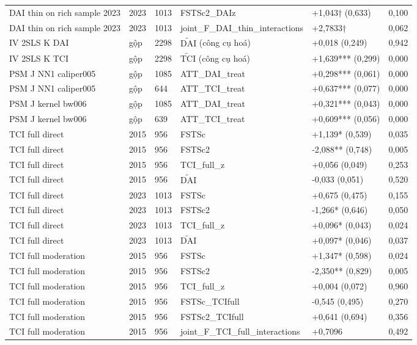 \documentclass[12pt,a4paper]{article}
\begin{document}
\begin{longtable}[]{@{}llllll@{}}
DAI thin on rich sample 2023 & 2023 & 1013 & FSTSc2\_DAIz & +1,043†
(0,633) & 0,100 \\
DAI thin on rich sample 2023 & 2023 & 1013 &
joint\_F\_DAI\_thin\_interactions & +2,7833† & 0,062 \\
IV 2SLS K DAI & gộp & 2298 & \(\tilde{\mathrm{DAI}}\) (công cụ hoá) &
+0,018 (0,249) & 0,942 \\
IV 2SLS K TCI & gộp & 2298 & \(\tilde{\mathrm{TCI}}\) (công cụ hoá) &
+1,639*** (0,299) & 0,000 \\
PSM J NN1 caliper005 & gộp & 1085 & ATT\_DAI\_treat & +0,298*** (0,061)
& 0,000 \\
PSM J NN1 caliper005 & gộp & 644 & ATT\_TCI\_treat & +0,637*** (0,077) &
0,000 \\
PSM J kernel bw006 & gộp & 1085 & ATT\_DAI\_treat & +0,321*** (0,043) &
0,000 \\
PSM J kernel bw006 & gộp & 639 & ATT\_TCI\_treat & +0,609*** (0,056) &
0,000 \\
TCI full direct & 2015 & 956 & FSTSc & +1,139* (0,539) & 0,035 \\
TCI full direct & 2015 & 956 & FSTSc2 & -2,088** (0,748) & 0,005 \\
TCI full direct & 2015 & 956 & TCI\_full\_z & +0,056 (0,049) & 0,253 \\
TCI full direct & 2015 & 956 & \(\tilde{\mathrm{DAI}}\) & -0,033 (0,051)
& 0,520 \\
TCI full direct & 2023 & 1013 & FSTSc & +0,675 (0,475) & 0,155 \\
TCI full direct & 2023 & 1013 & FSTSc2 & -1,266* (0,646) & 0,050 \\
TCI full direct & 2023 & 1013 & TCI\_full\_z & +0,096* (0,043) &
0,024 \\
TCI full direct & 2023 & 1013 & \(\tilde{\mathrm{DAI}}\) & +0,097*
(0,046) & 0,037 \\
TCI full moderation & 2015 & 956 & FSTSc & +1,347* (0,598) & 0,024 \\
TCI full moderation & 2015 & 956 & FSTSc2 & -2,350** (0,829) & 0,005 \\
TCI full moderation & 2015 & 956 & TCI\_full\_z & +0,004 (0,072) &
0,960 \\
TCI full moderation & 2015 & 956 & FSTSc\_TCIfull & -0,545 (0,495) &
0,270 \\
TCI full moderation & 2015 & 956 & FSTSc2\_TCIfull & +0,641 (0,694) &
0,356 \\
TCI full moderation & 2015 & 956 & joint\_F\_TCI\_full\_interactions &
+0,7096 & 0,492 \\

\end{longtable}
\end{document}
